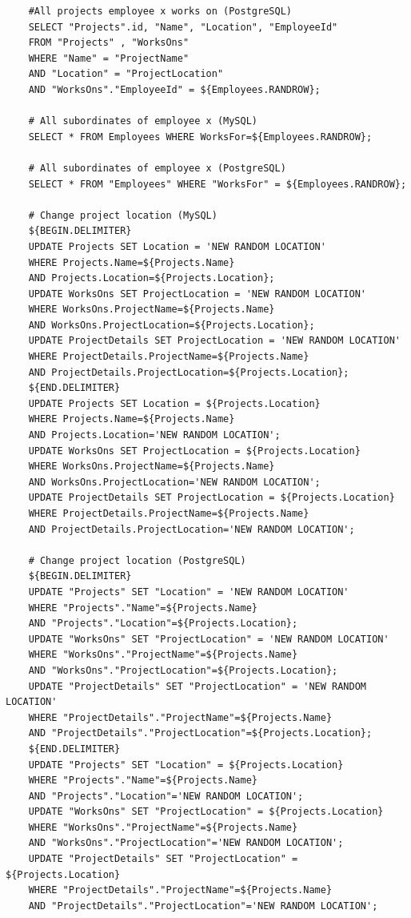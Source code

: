 \documentclass[12pt]{report}
\begin{document}
\begin{spacing}{1.9}
\begin{verbatim}
	#All projects employee x works on (PostgreSQL)
	SELECT "Projects".id, "Name", "Location", "EmployeeId"
	FROM "Projects" , "WorksOns"
	WHERE "Name" = "ProjectName"
	AND "Location" = "ProjectLocation"
	AND "WorksOns"."EmployeeId" = ${Employees.RANDROW};
	
	# All subordinates of employee x (MySQL)
	SELECT * FROM Employees WHERE WorksFor=${Employees.RANDROW};
	
	# All subordinates of employee x (PostgreSQL)
	SELECT * FROM "Employees" WHERE "WorksFor" = ${Employees.RANDROW};
	
	# Change project location (MySQL)
	${BEGIN.DELIMITER}
	UPDATE Projects SET Location = 'NEW RANDOM LOCATION' 
	WHERE Projects.Name=${Projects.Name} 
	AND Projects.Location=${Projects.Location};
	UPDATE WorksOns SET ProjectLocation = 'NEW RANDOM LOCATION' 
	WHERE WorksOns.ProjectName=${Projects.Name} 
	AND WorksOns.ProjectLocation=${Projects.Location};
	UPDATE ProjectDetails SET ProjectLocation = 'NEW RANDOM LOCATION' 
	WHERE ProjectDetails.ProjectName=${Projects.Name} 
	AND ProjectDetails.ProjectLocation=${Projects.Location};
	${END.DELIMITER}
	UPDATE Projects SET Location = ${Projects.Location} 
	WHERE Projects.Name=${Projects.Name} 
	AND Projects.Location='NEW RANDOM LOCATION';
	UPDATE WorksOns SET ProjectLocation = ${Projects.Location} 
	WHERE WorksOns.ProjectName=${Projects.Name} 
	AND WorksOns.ProjectLocation='NEW RANDOM LOCATION';
	UPDATE ProjectDetails SET ProjectLocation = ${Projects.Location} 
	WHERE ProjectDetails.ProjectName=${Projects.Name} 
	AND ProjectDetails.ProjectLocation='NEW RANDOM LOCATION';
	
	# Change project location (PostgreSQL)
	${BEGIN.DELIMITER}
	UPDATE "Projects" SET "Location" = 'NEW RANDOM LOCATION'
	WHERE "Projects"."Name"=${Projects.Name} 
	AND "Projects"."Location"=${Projects.Location};
	UPDATE "WorksOns" SET "ProjectLocation" = 'NEW RANDOM LOCATION'
	WHERE "WorksOns"."ProjectName"=${Projects.Name} 
	AND "WorksOns"."ProjectLocation"=${Projects.Location};
	UPDATE "ProjectDetails" SET "ProjectLocation" = 'NEW RANDOM LOCATION' 
	WHERE "ProjectDetails"."ProjectName"=${Projects.Name}
	AND "ProjectDetails"."ProjectLocation"=${Projects.Location};
	${END.DELIMITER}
	UPDATE "Projects" SET "Location" = ${Projects.Location}
	WHERE "Projects"."Name"=${Projects.Name} 
	AND "Projects"."Location"='NEW RANDOM LOCATION';
	UPDATE "WorksOns" SET "ProjectLocation" = ${Projects.Location}
	WHERE "WorksOns"."ProjectName"=${Projects.Name} 
	AND "WorksOns"."ProjectLocation"='NEW RANDOM LOCATION';
	UPDATE "ProjectDetails" SET "ProjectLocation" = ${Projects.Location}
	WHERE "ProjectDetails"."ProjectName"=${Projects.Name}
	AND "ProjectDetails"."ProjectLocation"='NEW RANDOM LOCATION';
	

\end{verbatim}
\end{spacing}
\end{document}
